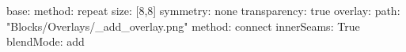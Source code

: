 base:
  method: repeat
  size: [8,8]
  symmetry: none
  transparency: true
overlay:
  path: "Blocks/Overlays/_add_overlay.png"
  method: connect
  innerSeams: True
blendMode: add
